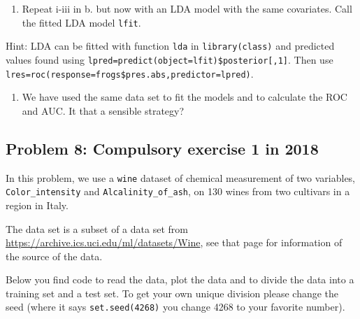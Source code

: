 \documentclass[]{article}
\newenvironment{Shaded}{\begin{snugshade}}{\end{snugshade}}
\newcommand{\KeywordTok}[1]{\textcolor[rgb]{0.13,0.29,0.53}{\textbf{#1}}}
\newcommand{\DataTypeTok}[1]{\textcolor[rgb]{0.13,0.29,0.53}{#1}}
\newcommand{\DecValTok}[1]{\textcolor[rgb]{0.00,0.00,0.81}{#1}}
\newcommand{\StringTok}[1]{\textcolor[rgb]{0.31,0.60,0.02}{#1}}
\newcommand{\OperatorTok}[1]{\textcolor[rgb]{0.81,0.36,0.00}{\textbf{#1}}}
\newcommand{\NormalTok}[1]{#1}
\providecommand{\tightlist}{%
  \setlength{\itemsep}{0pt}\setlength{\parskip}{0pt}}
\begin{document}
\begin{enumerate}
\def\labelenumi{\alph{enumi}.}
\setcounter{enumi}{2}
\tightlist
\item
  Repeat i-iii in b. but now with an LDA model with the same covariates.
  Call the fitted LDA model \texttt{lfit}.
\end{enumerate}

Hint: LDA can be fitted with function \texttt{lda} in
\texttt{library(class)} and predicted values found using
\texttt{lpred=predict(object=lfit)\$posterior{[},1{]}}. Then use
\texttt{lres=roc(response=frogs\$pres.abs,predictor=lpred)}.

\begin{enumerate}
\def\labelenumi{\alph{enumi}.}
\setcounter{enumi}{3}
\tightlist
\item
  We have used the same data set to fit the models and to calculate the
  ROC and AUC. It that a sensible strategy?
\end{enumerate}

\subsection{Problem 8: Compulsory exercise 1 in
2018}\label{problem-8-compulsory-exercise-1-in-2018}

In this problem, we use a \texttt{wine} dataset of chemical measurement
of two variables, \texttt{Color\_intensity} and
\texttt{Alcalinity\_of\_ash}, on 130 wines from two cultivars in a
region in Italy.

The data set is a subset of a data set from
\url{https://archive.ics.uci.edu/ml/datasets/Wine}, see that page for
information of the source of the data.

Below you find code to read the data, plot the data and to divide the
data into a training set and a test set. To get your own unique division
please change the seed (where it says \texttt{set.seed(4268)} you change
4268 to your favorite number).

\begin{Shaded}
\end{Shaded}
\end{document}
